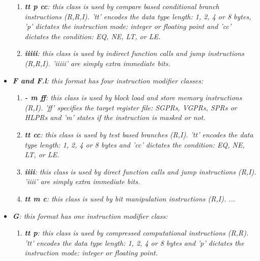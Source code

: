\begin{itemize}
\begin{enumerate}
                        \item \textit{\textbf{tt p cc}: this class is used by compare based conditional branch instructions (R,R,I). 'tt' encodes the data type length: 1, 2, 4 or 8 bytes, 'p' dictates the instruction mode: integer or floating point and 'cc' dictates the condition: EQ, NE, LT, or LE.}

                        \item \textit{\textbf{iiiii}: this class is used by indirect function calls and jump instructions (R,R,I). 'iiiii' are simply extra immediate bits.}

                    \end{enumerate}

                \item \textit{\textbf{F and F.l}: this format has four instruction modifier classes:}

                \begin{enumerate}

                    \item \textit{\textbf{- m ff}: this class is used by block load and store memory instructions (R,I). 'ff' specifies the target register file: SGPRs, VGPRs, SPRs or HLPRs and 'm' states if the instruction is masked or not.}

                    \item \textit{\textbf{tt cc}: this class is used by test based branches (R,I). 'tt' encodes the data type length: 1, 2, 4 or 8 bytes and 'cc' dictates the condition: EQ, NE, LT, or LE.}

                    \item \textit{\textbf{iiii}: this class is used by direct function calls and jump instructions (R,I). 'iiii' are simply extra immediate bits.}

                    \item \textit{\textbf{tt m c}: this class is used by bit manipulation instructions (R,I). ...}

                \end{enumerate}

                \item \textit{\textbf{G}: this format has one instruction modifier class:}

                    \begin{enumerate}

                        \item \textit{\textbf{tt p}: this class is used by compressed computational instructions (R,R). 'tt' encodes the data type length: 1, 2, 4 or 8 bytes and 'p' dictates the instruction mode: integer or floating point.}

                    \end{enumerate}

            \end{itemize}

